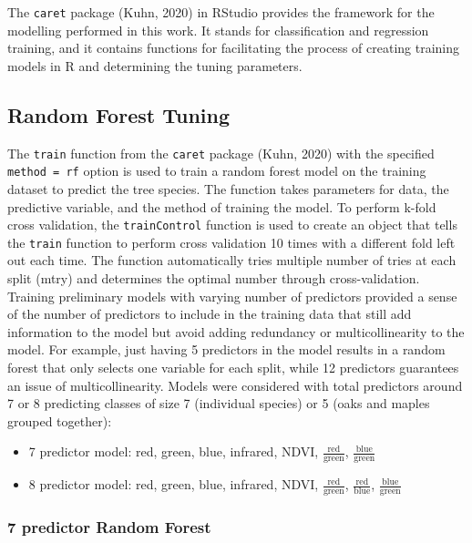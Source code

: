 \documentclass[12pt,twoside]{reedthesis}
\begin{document}
The \texttt{caret} package (Kuhn, 2020) in RStudio provides the framework for the modelling performed in this work. It stands for classification and regression training, and it contains functions for facilitating the process of creating training models in R and determining the tuning parameters.

\hypertarget{random-forest-tuning}{%
\subsection{Random Forest Tuning}\label{random-forest-tuning}}

The \texttt{train} function from the \texttt{caret} package (Kuhn, 2020) with the specified \texttt{method\ =\ rf} option is used to train a random forest model on the training dataset to predict the tree species. The function takes parameters for data, the predictive variable, and the method of training the model. To perform k-fold cross validation, the \texttt{trainControl} function is used to create an object that tells the \texttt{train} function to perform cross validation 10 times with a different fold left out each time. The function automatically tries multiple number of tries at each split (mtry) and determines the optimal number through cross-validation. Training preliminary models with varying number of predictors provided a sense of the number of predictors to include in the training data that still add information to the model but avoid adding redundancy or multicollinearity to the model. For example, just having 5 predictors in the model results in a random forest that only selects one variable for each split, while 12 predictors guarantees an issue of multicollinearity. Models were considered with total predictors around 7 or 8 predicting classes of size 7 (individual species) or 5 (oaks and maples grouped together):
\begin{itemize}
\item
  7 predictor model: red, green, blue, infrared, NDVI, \(\frac{\mbox{red}}{\mbox{green}}\), \(\frac{\mbox{blue}}{\mbox{green}}\)
\item
  8 predictor model: red, green, blue, infrared, NDVI, \(\frac{\mbox{red}}{\mbox{green}}\), \(\frac{\mbox{red}}{\mbox{blue}}\), \(\frac{\mbox{blue}}{\mbox{green}}\)
\end{itemize}
\hypertarget{predictor-random-forest}{%
\subsubsection{7 predictor Random Forest}\label{predictor-random-forest}}
\end{document}
